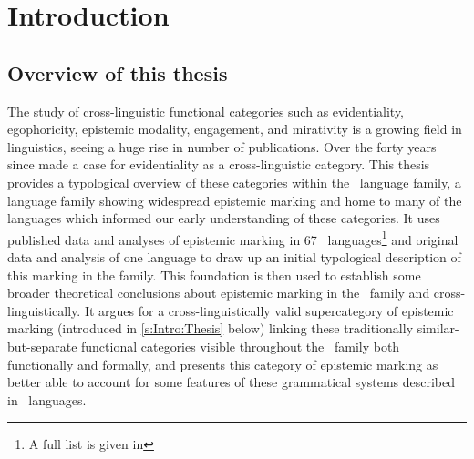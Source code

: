 \chapter{Introduction}\label{c:Introduction}
\section{Overview of this thesis}
The study of cross-linguistic functional categories such as evidentiality, egophoricity, epistemic modality, engagement, and mirativity is a growing field in linguistics, seeing a huge rise in number of publications. Over the forty years since  made a case for evidentiality as a cross-linguistic category. This thesis provides a typological overview of these categories within the \lfam\ language family, a language family showing widespread epistemic marking and home to many of the languages which informed our early understanding of these categories. It uses published data and analyses of epistemic marking in 67 \lfam\ languages\footnote{A full list is given in } and original data and analysis of one language to draw up an initial typological description of this marking in the family. This foundation is then used to establish some broader theoretical conclusions about epistemic marking in the \lfam\ family and cross-linguistically. It argues for a cross-linguistically valid supercategory of epistemic marking (introduced in \ref{s:Intro:Thesis} below) linking these traditionally similar-but-separate functional categories visible throughout the \lfam\ family both functionally and formally, and presents this category of epistemic marking as better able to account for some features of these grammatical systems described in \lfam\ languages.


